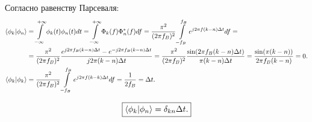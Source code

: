 Согласно равенству Парсеваля:
\begin{align*}
	\braket{\phi_k|\phi_n} &= \int \limits_{-\infty}^{+\infty} \phi_k(t)\phi_n(t)dt 
	= \int \limits_{-\infty}^{+\infty} \Phi_k(f) \Phi_n^*(f) df = 
	\dfrac{\pi^2}{(2 \pi  f_B)^2} \int \limits_{-f_B}^{f_B} e^{j2\pi f (k - n) \Delta t} df = \\
	&= \dfrac{\pi^2}{(2 \pi  f_B)^2} \dfrac{e^{j2\pi f_B (k - n) \Delta t} - e^{-j2\pi f_B (k - n) \Delta t}}{j2 \pi (k - n) \Delta t} = 
	\dfrac{\pi^2}{(2 \pi  f_B)^2} \dfrac{\sin(2\pi f_B (k - n) \Delta t)}{\pi (k - n) \Delta t} = 
	\dfrac{\sin(\pi (k - n))}{2 \pi  f_B (k - n)} = 0.\\
	\braket{\phi_k|\phi_k} &= \dfrac{\pi^2}{(2 \pi  f_B)^2} \int \limits_{-f_B}^{f_B} e^{j2\pi f (k - k) \Delta t} df =
	\dfrac{1}{2 f_B} = \Delta t.
\end{align*}

\begin{equation*}
	\boxed{\braket{\phi_k|\phi_n} = \delta_{kn} \Delta t. }
\end{equation*}

